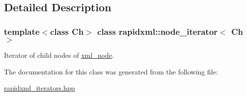 \subsection{Detailed Description}
\subsubsection*{template$<$class Ch$>$\newline
class rapidxml\+::node\+\_\+iterator$<$ Ch $>$}

Iterator of child nodes of \mbox{\hyperlink{classrapidxml_1_1xml__node}{xml\+\_\+node}}. 

The documentation for this class was generated from the following file\+:\begin{DoxyCompactItemize}
\item 
\mbox{\hyperlink{rapidxml__iterators_8hpp}{rapidxml\+\_\+iterators.\+hpp}}\end{DoxyCompactItemize}
